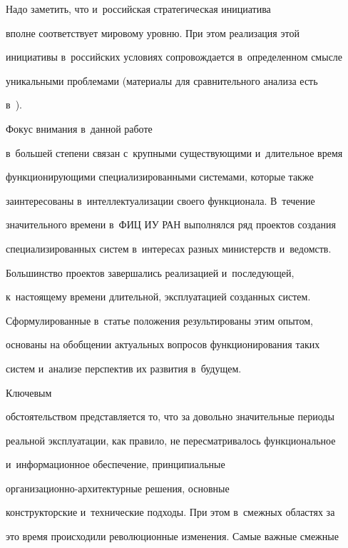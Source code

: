   

  Надо заметить, что и~российская стратегическая инициатива~\cite{9-zh} 

вполне соответствует мировому уровню. При этом реализация этой 

инициативы в~российских условиях сопровождается в~определенном смысле 

уникальными проблемами (материалы для сравнительного анализа есть 

в~\cite{10-zh, 11-zh, 12-zh, 13-zh}). 



\pagebreak



Фокус внимания в~данной работе 

в~большей степени связан с~крупными существующими и~длительное время 

функционирующими специализированными системами, которые также 

заинтересованы в~интеллектуализации своего функционала. В~течение 

значительного времени в~ФИЦ ИУ РАН выполнялся ряд проектов создания 

специализированных сис\-тем в~интересах разных министерств и~ведомств. 

Большинство проектов завершались реализацией и~последующей, 

к~на\-сто\-яще\-му времени длительной, эксплуатацией созданных сис\-тем. 

Сформулированные в~\mbox{статье} положения результированы этим опытом, 

основаны на обобщении актуальных вопросов функционирования таких 

систем и~анализе перспектив их развития в~бу\-дущем. 







Ключевым 

обстоятельством представляется то, что за довольно значительные периоды 

реальной эксплуатации, как правило, не пересматривалось функциональное 

и~информационное обеспечение, принципиальные  

ор\-га\-ни\-за\-ци\-он\-но-ар\-хи\-тек\-тур\-ные решения, основные 

конструкторские и~технические подходы. При этом в~смежных областях за 

это время происходили революционные изменения. Самые важные смежные 

